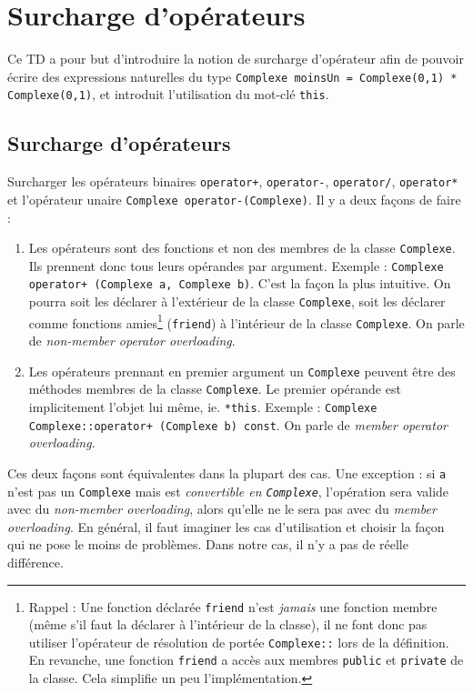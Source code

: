 \documentclass{book}
\newcommand{\inline}[1]{\texttt{#1}}
\begin{document}
\setcounter{chapter}{3}
\chapter{\label{ch:surcharge}Surcharge d'opérateurs}

Ce TD a pour but d'introduire la notion de surcharge d'opérateur afin de pouvoir écrire des expressions naturelles du type \inline{Complexe moinsUn = Complexe(0,1) * Complexe(0,1)}, et introduit l'utilisation du mot-clé \inline{this}.

\section{Surcharge d'opérateurs}
Surcharger les opérateurs binaires \inline{operator+}, \inline{operator-}, \inline{operator/}, \inline{operator*} et l'opérateur unaire \inline{Complexe operator-(Complexe)}. Il y a deux façons de faire :
\begin{enumerate}
\item Les opérateurs sont des fonctions et non des membres de la classe \texttt{Complexe}. Ils prennent donc tous leurs opérandes par argument. Exemple : \inline{Complexe operator+ (Complexe a, Complexe b)}. C'est la façon la plus intuitive. On pourra soit les déclarer à l'extérieur de la classe \inline{Complexe}, soit les déclarer comme fonctions amies\footnote{Rappel : Une fonction déclarée \inline{friend} n'est \emph{jamais} une fonction membre (même s'il faut la déclarer à l'intérieur de la classe), il ne font donc pas utiliser l'opérateur de résolution de portée \inline{Complexe::} lors de la définition. En revanche, une fonction \inline{friend} a accès aux membres \inline{public} et \inline{private} de la classe. Cela simplifie un peu l'implémentation.} (\inline{friend}) à l'intérieur de la classe \inline{Complexe}. On parle de \textit{non-member operator overloading}.
\item Les opérateurs prennant en premier argument un \texttt{Complexe} peuvent être des méthodes membres de la classe \texttt{Complexe}. Le premier opérande est implicitement l'objet lui même, ie. \inline{*this}. Exemple : \inline{Complexe Complexe::operator+ (Complexe b) const}. On parle de \textit{member operator overloading}.
\end{enumerate}
Ces deux façons sont équivalentes dans la plupart des cas. Une exception : si \texttt{a} n'est pas un \texttt{Complexe} mais est \emph{convertible en \texttt{Complexe}}, l'opération sera valide avec du \textit{non-member overloading}, alors qu'elle ne le sera pas avec du \textit{member overloading}. En général, il faut imaginer les cas d'utilisation et choisir la façon qui ne pose le moins de problèmes. Dans notre cas, il n'y a pas de réelle différence. \\
\end{document}
